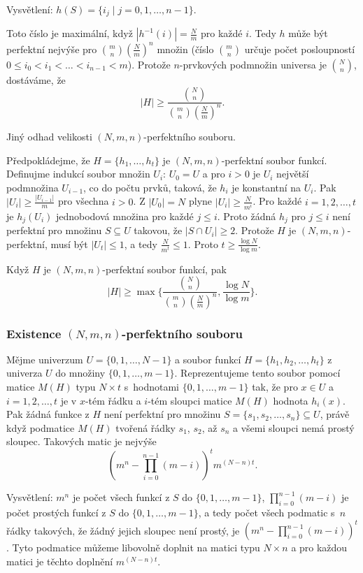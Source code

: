 \documentclass[a4paper,12pt]{article}
\begin{document}
Vysvětlení: $h(S)=\{i_j\mid j=0,1,\dots,n-1\}$.

Toto číslo je maximální, když $|h^{-1}(
i)|=\frac Nm$ pro každé $i$. 
Tedy $h$ může být perfektní nejvýše pro $\binom 
mn(\frac Nm)^n$ 
množin (číslo $\binom mn$ určuje počet posloupností 
$0\le i_0<i_1<\dots<i_{n-1}<m$). Protože $n$-prvkových 
podmnožin universa je $\binom Nn$, dostáváme, že 
$$|H|\ge\frac {\binom Nn}{\binom mn(\frac Nm)^n}.$$

Jiný odhad velikosti $(N,m,n)$-perfektního souboru.

Předpokládejme, že $H=\{h_1,\dots,h_t\}$ je 
$(N,m,n)$-perfektní soubor funkcí.  Definujme indukcí 
soubor množin $U_i$:\newline 
$U_0=U$ a pro 
$i>0$ je $U_i$ největší podmnožina $U_{i-1}$, co do počtu 
prvků, 
taková, že $h_i$ je konstantní na $U_i$.  Pak $|U_i|\ge\frac {
|U_{i-1}|}m$ 
pro všechna $i>0$.  Z $|U_0|=N$ plyne $|U_i|\ge\frac N{m^i}$.  Pro každé 
$i=1,2,\dots,t$ je $h_j(U_i)$ jednobodová množina pro každé 
$j\le i$.  Proto žádná $h_j$ pro $j\le i$ není perfektní pro 
množinu $S\subseteq U$ takovou, že $|S\cap U_i|\ge 2$.  Protože $
H$ je 
$(N,m,n)$-perfektní, musí být $|U_t|\le 1$, a tedy $\frac 
N{m^t}\le 1$.  Proto 
$t\ge\frac {\log N}{\log m}$.    

\begin{veta}Když $H$ je $(N,m,n)$-perfektní soubor 
funkcí, pak 
$$|H|\ge\max\{\frac {\binom Nn}{\binom mn(\frac Nm)^n},\frac {\log 
N}{\log m}\}.$$
\end{veta}

\subsubsection{Existence $(N,m,n)$-perfektního souboru}

Mějme univerzum $U=\{0,1,\dots,N-1\}$ a soubor 
funkcí $H=\{h_1,h_2,\dots,h_t\}$ z univerza $U$ do množiny 
$\{0,1,\dots,m-1\}$.  Reprezentujeme tento soubor pomocí 
matice $M(H)$ typu $N\times t$ s~hodnotami $\{0,1,\dots,m-1\}$ tak, 
že pro $x\in U$ a $i=1,2,\dots,t$ je 
v $x$-tém řádku a $i$-tém sloupci matice $M(H)$ 
hodnota $h_i(x)$. Pak žádná funkce z $H$ 
není perfektní pro množinu $S=\{s_1,s_2,\dots,s_n\}\subseteq 
U$, 
právě když podmatice $M(H)$ tvoře\-ná 
řádky $s_1$, $s_2$, až $s_n$ a všemi sloupci nemá prostý sloupec. 
Ta\-ko\-vých matic je nejvýše 
$$(m^n-\prod_{i=0}^{n-1}(m-i))^tm^{(N-n)t}.$$

Vysvětlení:  $m^n$ je počet všech funkcí z $
S$ do 
$\{0,1,\dots,m-1\}$, $\prod_{i=0}^{n-1}(m-i)$ je počet prostých funkcí z $
S$ 
do $\{0,1,\dots,m-1\}$, a tedy počet všech podmatic s~$n$ 
řádky takových, že žádný jejich sloupec není prostý, je 
$(m^n-\prod_{i=0}^{n-1}(m-i))^t$.  Tyto podmatice můžeme 
libovolně doplnit na matici typu $N\times n$ a pro každou 
matici je těchto doplnění $m^{(N-n)t}$.  
\end{document}
